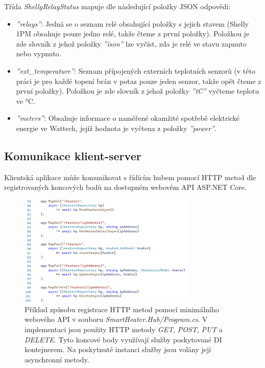 \noindent Třída {\it ShellyRelayStatus} mapuje dle \cite{shelly-api-status} následující položky JSON odpovědi:
\begin{itemize}
    \item {\it ''relays''}: Jedná se o seznam relé obsahující položky s jejich stavem (Shelly 1PM obsahuje pouze jedno relé, takže čteme z první položky). Položkou je zde slovník z jehož položky {\it ''ison''} lze vyčíst, zda je relé ve stavu zapnuto nebo vypnuto.
    \item {\it ''ext\_temperature''}: Seznam přípojených externích teplotních senzorů (v této práci je pro každé topení brán v potaz pouze jeden senzor, takže opět čteme z první položky). Položkou je zde slovník z jehož položky {\it ''tC''} vyčteme teplotu ve °C.
    \item {\it ''meters''}: Obsahuje informace o naměřené okamžité spotřebě elektrické energie ve Wattech, jejíž hodnota je vyčtena z položky {\it ''power''}.
\end{itemize}

\pagebreak

\subsection{Komunikace klient-server}
Klientská aplikace může komunikovat s řídícím hubem pomocí HTTP metod dle registrovaných koncových bodů na dostupném webovém API ASP.NET Core.

\begin{figure}[hbt]
\includegraphics[width=0.75\textwidth]{obrazky-figures/code-endpoints.png}
\caption{Příklad způsobu registrace HTTP metod pomocí minimálního webového API v souboru {\it SmartHeater.Hub/Program.cs}. V implementaci jsou použity HTTP metody {\it GET}, {\it POST}, {\it PUT} a {\it DELETE}. Tyto koncové body využívají služby poskytované DI kontejnerem. Na poskytnuté instanci služby jsou volány její asynchronní metody.}
\end{figure}

